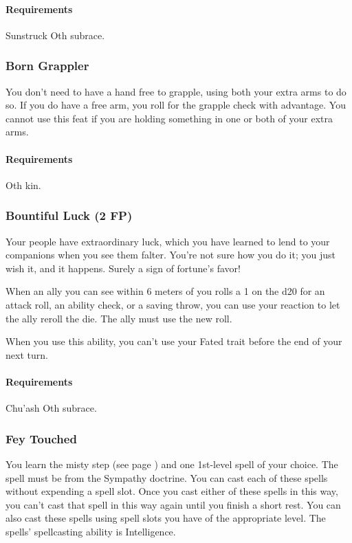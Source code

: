         \paragraph{Requirements} Sunstruck Oth subrace.
    \subsubsection{Born Grappler} \label{feat::borngrappler}
        You don't need to have a hand free to grapple, using both your extra arms to do so.
        If you do have a free arm, you roll for the grapple check with advantage.
        You cannot use this feat if you are holding something in one or both of your extra arms.
        \paragraph{Requirements} Oth kin.
    \subsubsection{Bountiful Luck (2 FP)} \label{feat::bountifulluck}
        Your people have extraordinary luck, which you have learned to lend to your companions when you see them falter.
        You're not sure how you do it; you just wish it, and it happens.
        Surely a sign of fortune's favor!

        When an ally you can see within 6 meters of you rolls a 1 on the d20 for an attack roll, an ability check, or a saving throw, you can use your reaction to let the ally reroll the die.
        The ally must use the new roll.

        When you use this ability, you can't use your Fated trait before the end of your next turn.
        \paragraph{Requirements} Chu'ash Oth subrace.
    \subsubsection{Fey Touched} \label{feat::feytouched} %
        You learn the misty step (see page \pageref{spell::mistystep}) and one 1st-level spell of your choice.
        The spell must be from the Sympathy doctrine.
        You can cast each of these spells without expending a spell slot.
        Once you cast either of these spells in this way, you can't cast that spell in this way again until you finish a short rest.
        You can also cast these spells using spell slots you have of the appropriate level.
        The spells' spellcasting ability is Intelligence.
